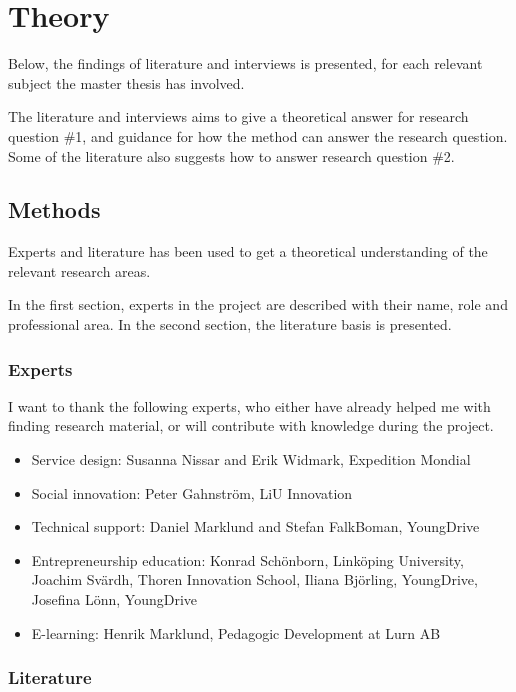 \chapter{Theory}\label{cha:Theory}
%

Below, the findings of literature and interviews is presented, for each relevant subject the master thesis has involved.

The literature and interviews aims to give a theoretical answer for research question \#1, and guidance for how the method can answer the research question. Some of the literature also suggests how to answer research question \#2.

\section{Methods}

Experts and literature has been used to get a theoretical understanding of the relevant research areas.

In the first section, experts in the project are described with their name, role and professional area. In the second section, the literature basis is presented.

\subsection{Experts}
I want to thank the following experts, who either have already helped me with finding research material, or will contribute with knowledge during the project.

\begin{itemize}
    \item Service design: Susanna Nissar and Erik Widmark, Expedition Mondial
	\item Social innovation: Peter Gahnström, LiU Innovation
    \item Technical support: Daniel Marklund and Stefan FalkBoman, YoungDrive
    \item Entrepreneurship education: Konrad Schönborn, Linköping University, Joachim Svärdh, Thoren Innovation School, Iliana Björling, YoungDrive, Josefina Lönn, YoungDrive
	\item E-learning: Henrik Marklund, Pedagogic Development at Lurn AB %
\end{itemize}

\subsection{Literature}

